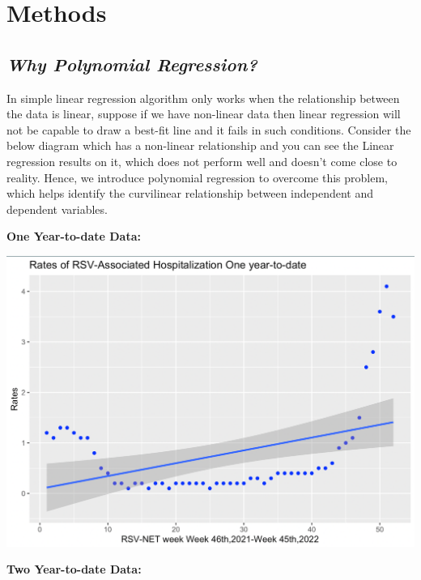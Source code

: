 \documentclass[
  letterpaper,
  DIV=11,
  numbers=noendperiod]{scrreport}
\begin{document}
\hypertarget{methods}{%
\section{Methods}\label{methods}}

\hypertarget{why-polynomial-regression}{%
\subsection{\texorpdfstring{\emph{Why Polynomial
Regression?}}{Why Polynomial Regression?}}\label{why-polynomial-regression}}

In simple linear regression algorithm only works when the relationship
between the data is linear, suppose if we have non-linear data then
linear regression will not be capable to draw a best-fit line and it
fails in such conditions. Consider the below diagram which has a
non-linear relationship and you can see the Linear regression results on
it, which does not perform well and doesn't come close to reality.
Hence, we introduce polynomial regression to overcome this problem,
which helps identify the curvilinear relationship between independent
and dependent variables.

\textbf{One Year-to-date Data:}

\includegraphics[width=6.59375in,height=\textheight]{./images/paste-4507D324.png}

\textbf{Two Year-to-date Data:}
\end{document}

